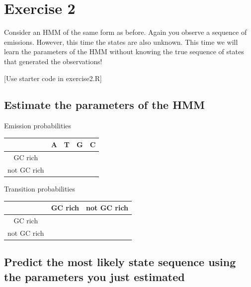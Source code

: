 \documentclass[11pt, oneside]{article}
\begin{document}
\section{Exercise 2}
Consider an HMM of the same form as before. 
Again you observe a sequence of emissions. 
However, this time the states are also unknown. 
This time we will learn the parameters of the HMM without knowing the true sequence of states that generated the observations! 

[Use starter code in exercise2.R]

\subsection{Estimate the parameters of the HMM}
Emission probabilities
\begin{table}[H]
\centering
\begin{tabular}{|c|c|c|c|c|}
\hline
& A & T & G & C \\\hline
GC rich & & & &  \\\hline
not GC rich & & & & \\\hline
\end{tabular}
\end{table}

Transition probabilities
\begin{table}[H]
\centering
\begin{tabular}{|c|c|c|}
\hline
& GC rich & not GC rich \\\hline
GC rich & &  \\\hline
not GC rich & &  \\\hline
\end{tabular}
\end{table}

\subsection{Predict the most likely state sequence using the parameters you just estimated}
\end{document}
